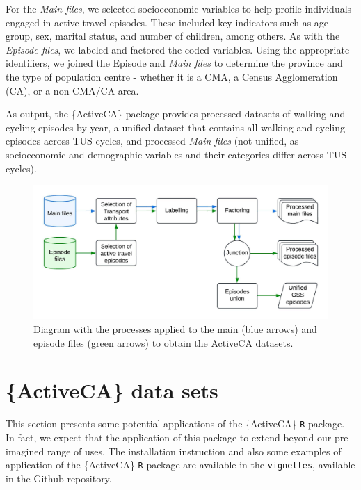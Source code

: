 \documentclass[Royal,times,sageh]{sagej}
\begin{document}
For the \emph{Main files}, we selected socioeconomic variables to help
profile individuals engaged in active travel episodes. These included
key indicators such as age group, sex, marital status, and number of
children, among others. As with the \emph{Episode files}, we labeled and
factored the coded variables. Using the appropriate identifiers, we
joined the Episode and \emph{Main files} to determine the province and
the type of population centre - whether it is a CMA, a Census
Agglomeration (CA), or a non-CMA/CA area.

As output, the \{ActiveCA\} package provides processed datasets of
walking and cycling episodes by year, a unified dataset that contains
all walking and cycling episodes across TUS cycles, and processed
\emph{Main files} (not unified, as socioeconomic and demographic
variables and their categories differ across TUS cycles).

\begin{figure}

{\centering \includegraphics[width=1\linewidth]{Manuscript-figures/RPackages - ActiveCA} 

}

\caption{Diagram with the processes applied to the main (blue arrows) and episode files (green arrows) to obtain the ActiveCA datasets.}\label{fig:process-figure}
\end{figure}

\section{\{ActiveCA\} data sets}\label{activeca-data-sets}

This section presents some potential applications of the \{ActiveCA\}
\texttt{R} package. In fact, we expect that the application of this
package to extend beyond our pre-imagined range of uses. The
installation instruction and also some examples of application of the
\{ActiveCA\} \texttt{R} package are available in the \texttt{vignettes},
available in the Github repository.
\end{document}
